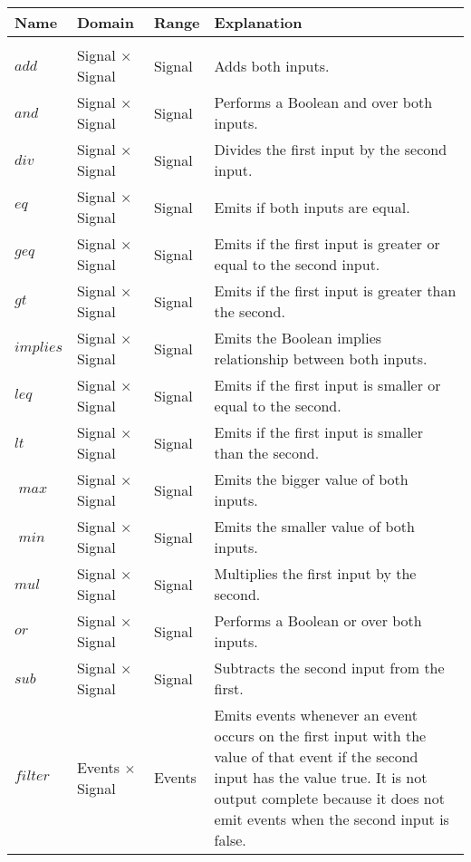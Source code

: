 \begin{longtable}{lp{3cm}lp{6cm}}
  Name                 & Domain                    & Range   & Explanation \\
  \toprule \\
  \endhead{}
  \(\mathit{add}\)              & Signal \(\times\) Signal  & Signal  & Adds both inputs. \\
  \(\mathit{and}\)              & Signal \(\times\) Signal  & Signal  & Performs a Boolean and over both inputs. \\
  \(\mathit{div}\)              & Signal \(\times\) Signal  & Signal  & Divides the first input by the second input. \\
  \(\mathit{eq}\)               & Signal \(\times\) Signal  & Signal  & Emits if both inputs are equal. \\
  \(\mathit{geq}\)              & Signal \(\times\) Signal  & Signal  & Emits if the first input is greater or equal to the second input. \\
  \(\mathit{gt}\)               & Signal \(\times\) Signal  & Signal  & Emits if the first input is greater than the second.\\
  \(\mathit{implies}\)          & Signal \(\times\) Signal  & Signal  & Emits the Boolean implies relationship between both inputs.\\
  \(\mathit{leq}\)              & Signal \(\times\) Signal  & Signal  & Emits if the first input is smaller or equal to the second.\\
  \(\mathit{lt}\)               & Signal \(\times\) Signal  & Signal  & Emits if the first input is smaller than the second.\\
  \(\mathit{\max}\)              & Signal \(\times\) Signal  & Signal  & Emits the bigger value of both inputs. \\
  \(\mathit{\min}\)              & Signal \(\times\) Signal  & Signal  & Emits the smaller value of both inputs.\\
  \(\mathit{mul}\)              & Signal \(\times\) Signal  & Signal  & Multiplies the first input by the second.\\
  \(\mathit{or}\)               & Signal \(\times\) Signal  & Signal  & Performs a Boolean or over both inputs.\\
  \(\mathit{sub}\)              & Signal \(\times\) Signal  & Signal  & Subtracts the second input from the first.\\
  \(\mathit{filter}\)           & Events \(\times\) Signal  & Events  & Emits events whenever an event occurs on the first input with the value of that event if the second input has the value true. It is not output complete because it does not emit events when the second input is false. \\

\end{longtable}
